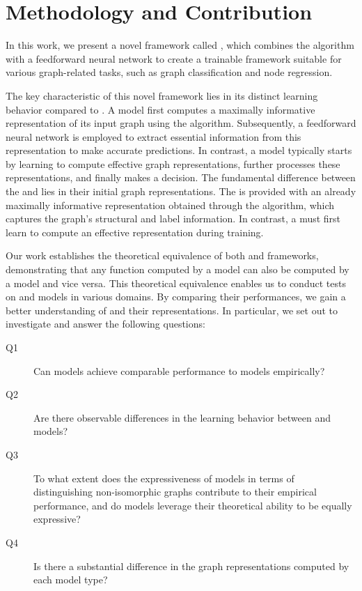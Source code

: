 
\section{Methodology and Contribution}
In this work, we present a novel framework called \wlnn, which combines the \wl algorithm with a feedforward neural network to create a trainable framework suitable for various graph-related tasks, such as graph classification and node regression.

The key characteristic of this novel framework lies in its distinct learning behavior compared to \gnns. A \wlnn model first computes a maximally informative representation of its input graph using the \wl algorithm. Subsequently, a feedforward neural network is employed to extract essential information from this representation to make accurate predictions. In contrast, a \gnn model typically starts by learning to compute effective graph representations, further processes these representations, and finally makes a decision. The fundamental difference between the \wlnn and \gnn lies in their initial graph representations. The \wlnn is provided with an already maximally informative representation obtained through the \wl algorithm, which captures the graph's structural and label information. In contrast, a \gnn must first learn to compute an effective representation during training.

Our work establishes the theoretical equivalence of both \wlnn and \gnn frameworks, demonstrating that any function computed by a \wlnn model can also be computed by a \gnn model and vice versa. This theoretical equivalence enables us to conduct tests on \wlnn and \gnn models in various domains. By comparing their performances, we gain a better understanding of \gnns and their representations. In particular, we set out to investigate and answer the following questions:\medskip

\begin{description}
	\item[Q1] Can \wlnn models achieve comparable performance to \gnn models empirically?

	\item[Q2] Are there observable differences in the learning behavior between \wlnn and \gnn models?

	\item[Q3] To what extent does the expressiveness of \wlnn models in terms of distinguishing non-isomorphic graphs contribute to their empirical performance, and do \gnn models leverage their theoretical ability to be equally expressive?
	
	\item[Q4] Is there a substantial difference in the graph representations computed by each model type?
\end{description}

